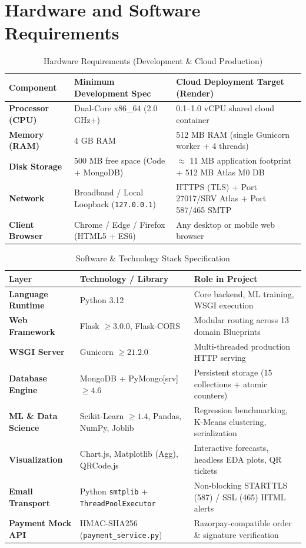\documentclass[12pt,a4paper,oneside]{report}
\begin{document}
\section{Hardware and Software Requirements}

\begin{table}[H]
\centering
\caption{Hardware Requirements (Development \& Cloud Production)}
\label{tab:hw_req}
\begin{tabularx}{\textwidth}{>{\bfseries}p{4.2cm} X X}
\toprule
\textbf{Component} & \textbf{Minimum Development Spec} & \textbf{Cloud Deployment Target (Render)} \\
\midrule
Processor (CPU) & Dual-Core x86\_64 (2.0 GHz+) & 0.1--1.0 vCPU shared cloud container \\
Memory (RAM) & 4 GB RAM & 512 MB RAM (single Gunicorn worker + 4 threads) \\
Disk Storage & 500 MB free space (Code + MongoDB) & $\approx$ 11 MB application footprint + 512 MB Atlas M0 DB \\
Network & Broadband / Local Loopback (\texttt{127.0.0.1}) & HTTPS (TLS) + Port 27017/SRV Atlas + Port 587/465 SMTP \\
Client Browser & Chrome / Edge / Firefox (HTML5 + ES6) & Any desktop or mobile web browser \\
\bottomrule
\end{tabularx}
\end{table}

\begin{table}[H]
\centering
\caption{Software \& Technology Stack Specification}
\label{tab:sw_req}
\begin{tabularx}{\textwidth}{>{\bfseries}p{4.2cm} p{4.2cm} X}
\toprule
\textbf{Layer} & \textbf{Technology / Library} & \textbf{Role in Project} \\
\midrule
Language Runtime & Python 3.12 & Core backend, ML training, WSGI execution \\
Web Framework & Flask $\ge 3.0.0$, Flask-CORS & Modular routing across 13 domain Blueprints \\
WSGI Server & Gunicorn $\ge 21.2.0$ & Multi-threaded production HTTP serving \\
Database Engine & MongoDB + PyMongo[srv] $\ge 4.6$ & Persistent storage (15 collections + atomic counters) \\
ML \& Data Science & Scikit-Learn $\ge 1.4$, Pandas, NumPy, Joblib & Regression benchmarking, K-Means clustering, serialization \\
Visualization & Chart.js, Matplotlib (Agg), QRCode.js & Interactive forecasts, headless EDA plots, QR tickets \\
Email Transport & Python \texttt{smtplib} + \texttt{ThreadPoolExecutor} & Non-blocking STARTTLS (587) / SSL (465) HTML alerts \\
Payment Mock API & HMAC-SHA256 (\texttt{payment\_service.py}) & Razorpay-compatible order \& signature verification \\
\bottomrule
\end{tabularx}
\end{table}
\end{document}
